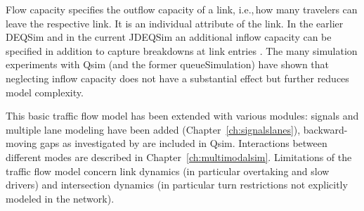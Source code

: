Flow capacity specifies the outflow capacity of a link, i.e.,\,how many travelers can leave the respective link. It is an individual attribute of the link. In the earlier DEQSim and in the current JDEQSim an additional inflow capacity can be specified in addition to capture breakdowns at link entries \citep[][p.99]{Charypar_PhDThesis_2008}. The many simulation experiments with Qsim (and the former queueSimulation) have shown that neglecting inflow capacity does not have a substantial effect but further reduces model complexity. 

This basic traffic flow model has been extended with various modules: signals and multiple lane modeling have been added (Chapter~\ref{ch:signalslanes}), backward-moving gaps as investigated by \citet[][]{Charypar_PhDThesis_2008} are included in Qsim. Interactions between different modes are described in Chapter~\ref{ch:multimodalsim}. Limitations of the traffic flow model concern link dynamics (in particular overtaking and slow drivers) and intersection dynamics (in particular turn restrictions not explicitly modeled in the network). 


